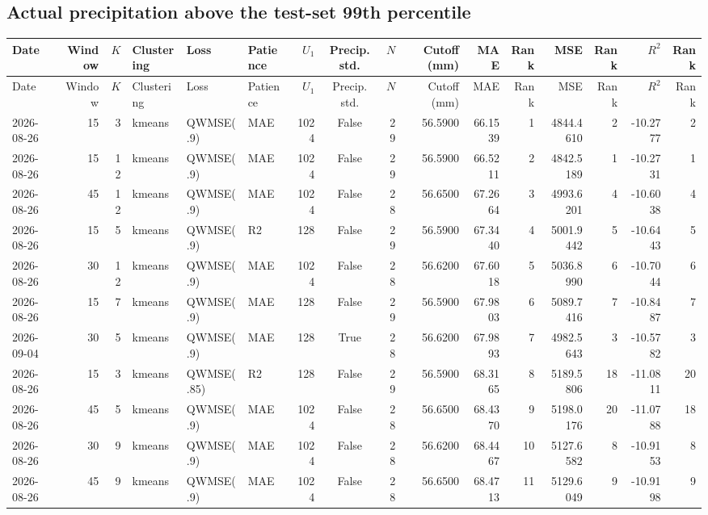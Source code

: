 \documentclass[10pt]{article}
\begin{document}
\begin{landscape}
\subsection*{Actual precipitation above the test-set 99th percentile}
\footnotesize
\setlength{\tabcolsep}{3pt}
\begin{longtable}{@{}lrrlllrcrrrrrrrr@{}}
\toprule
Date & Window & $K$ & Clustering & Loss & Patience & $U_1$ & Precip. std. & $N$ & Cutoff (mm) & MAE & Rank & MSE & Rank & $R^2$ & Rank \\
\midrule
\endfirsthead
\toprule
Date & Window & $K$ & Clustering & Loss & Patience & $U_1$ & Precip. std. & $N$ & Cutoff (mm) & MAE & Rank & MSE & Rank & $R^2$ & Rank \\
\midrule
\endhead
2026-08-26 & 15 & 3 & kmeans & QWMSE(.9) & MAE & 1024 & False & 29 & 56.5900 & 66.1539 & 1 & 4844.4610 & 2 & -10.2777 & 2 \\
2026-08-26 & 15 & 12 & kmeans & QWMSE(.9) & MAE & 1024 & False & 29 & 56.5900 & 66.5211 & 2 & 4842.5189 & 1 & -10.2731 & 1 \\
2026-08-26 & 45 & 12 & kmeans & QWMSE(.9) & MAE & 1024 & False & 28 & 56.6500 & 67.2664 & 3 & 4993.6201 & 4 & -10.6038 & 4 \\
2026-08-26 & 15 & 5 & kmeans & QWMSE(.9) & R2 & 128 & False & 29 & 56.5900 & 67.3440 & 4 & 5001.9442 & 5 & -10.6443 & 5 \\
2026-08-26 & 30 & 12 & kmeans & QWMSE(.9) & MAE & 1024 & False & 28 & 56.6200 & 67.6018 & 5 & 5036.8990 & 6 & -10.7044 & 6 \\
2026-08-26 & 15 & 7 & kmeans & QWMSE(.9) & MAE & 128 & False & 29 & 56.5900 & 67.9803 & 6 & 5089.7416 & 7 & -10.8487 & 7 \\
2026-09-04 & 30 & 5 & kmeans & QWMSE(.9) & MAE & 128 & True & 28 & 56.6200 & 67.9893 & 7 & 4982.5643 & 3 & -10.5782 & 3 \\
2026-08-26 & 15 & 3 & kmeans & QWMSE(.85) & R2 & 128 & False & 29 & 56.5900 & 68.3165 & 8 & 5189.5806 & 18 & -11.0811 & 20 \\
2026-08-26 & 45 & 5 & kmeans & QWMSE(.9) & MAE & 1024 & False & 28 & 56.6500 & 68.4370 & 9 & 5198.0176 & 20 & -11.0788 & 18 \\
2026-08-26 & 30 & 9 & kmeans & QWMSE(.9) & MAE & 1024 & False & 28 & 56.6200 & 68.4467 & 10 & 5127.6582 & 8 & -10.9153 & 8 \\
2026-08-26 & 45 & 9 & kmeans & QWMSE(.9) & MAE & 1024 & False & 28 & 56.6500 & 68.4713 & 11 & 5129.6049 & 9 & -10.9198 & 9 \\

\end{longtable}
\end{landscape}
\end{document}
